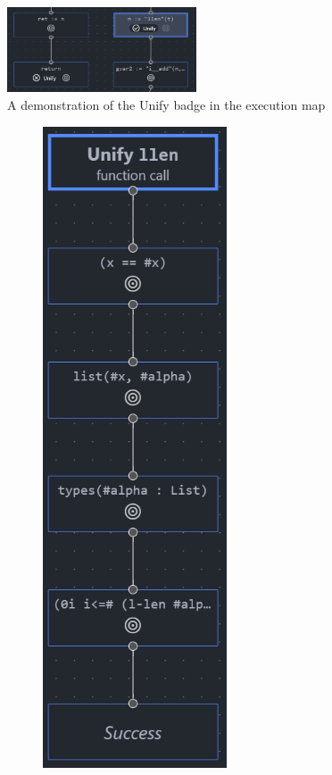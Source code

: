 \begin{figure}
  \centering
  \includegraphics[width=0.5\textwidth]{img/execmap-unify.png}
  \caption{A demonstration of the Unify badge in the execution map}%
  \label{fig:execmap-unify}
\end{figure}

\begin{figure}
  \centering
  \begin{subfigure}[b]{0.3\textwidth}
    \centering
    \includegraphics[width=0.6\textwidth]{img/unifymap-init.png}

\end{subfigure}
\end{figure}

